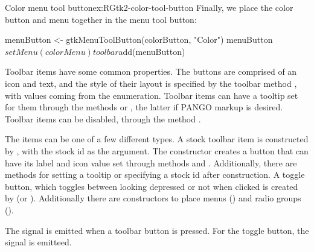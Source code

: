 \begin{example}{Color menu tool button}{ex:RGtk2-color-tool-button}
Finally, we place the color button and menu together in the menu tool
button:
\begin{Schunk}
\begin{Sinput}
 menuButton <- gtkMenuToolButton(colorButton, "Color")
 menuButton$setMenu(colorMenu)
 toolbar$add(menuButton)
\end{Sinput}
\end{Schunk}
\end{example}

Toolbar items have some common properties. The buttons are comprised
of an icon and text, and the style of their layout is specified by the
toolbar method , with values coming from
the  enumeration. Toolbar items can have a
tooltip set for them through the methods
 or
, the latter if PANGO markup is
desired. Toolbar items can be disabled, through the method
.

The items can be one of a few different types. A stock toolbar item is
constructed by , with the
stock id as the argument. The constructor
 creates a button that can have its
label and icon value set through methods
 and
. Additionally, there are
methods for setting a tooltip or specifying a stock id after
construction. A toggle button, which toggles between looking depressed
or not when clicked is created by 
(or ).  Additionally
there are constructors to place menus
() and radio groups
().
  
The  signal is emitted when a toolbar button is
pressed. For the toggle button, the  signal is
emitteed.



